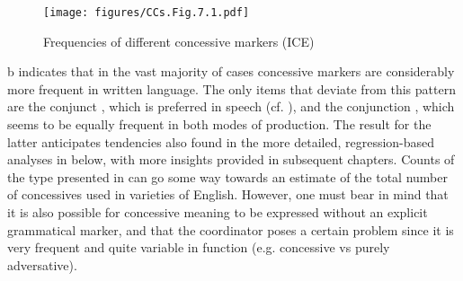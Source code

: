 \begin{figure}
\texttt{[image: figures/CCs.Fig.7.1.pdf]}
\caption{\label{bkm:Ref477783402}\label{fig:7.1}Frequencies of different concessive markers (ICE)}
\end{figure}

b indicates that in the vast majority of cases concessive markers are considerably more frequent in written language. The only items that deviate from this pattern are the conjunct , which is preferred in speech (cf. \citealt{Schützler2020a}), and the conjunction , which seems to be equally frequent in both modes of production. The result for the latter anticipates tendencies also found in the more detailed, regression-based analyses in  below, with more insights provided in subsequent chapters. Counts of the type presented in  can go some way towards an estimate of the total number of concessives used in varieties of English. However, one must bear in mind that it is also possible for concessive meaning to be expressed without an explicit grammatical marker, and that the coordinator  poses a certain problem since it is very frequent and quite variable in function (e.g. concessive vs purely adversative).

